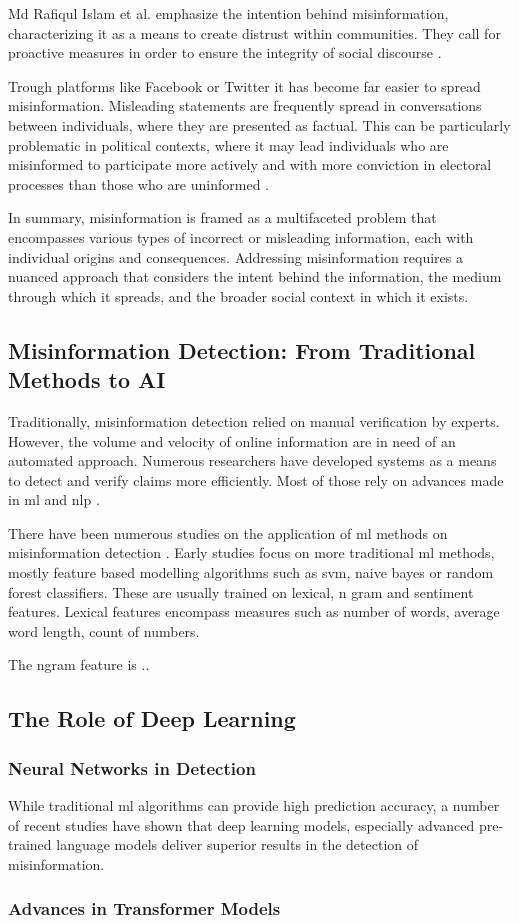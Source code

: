 Md Rafiqul Islam et al. emphasize the intention behind misinformation, characterizing it as a means to create distrust within communities. They call for proactive measures in order to ensure the integrity of social discourse \cite{mi_rafiqul}. 

Trough platforms like Facebook or Twitter it has become far easier to spread misinformation. Misleading statements are frequently spread in conversations between individuals, where they are presented as factual. This can be particularly problematic in political contexts, where it may lead individuals who are misinformed to participate more actively and with more conviction in electoral processes than those who are uninformed \cite{mi_fernandez}.

In summary, misinformation is framed as a multifaceted problem that encompasses various types of incorrect or misleading information, each with individual origins and consequences. Addressing misinformation requires a nuanced approach that considers the intent behind the information, the medium through which it spreads, and the broader social context in which it exists.

\subsection{Misinformation Detection: From Traditional Methods to AI}
Traditionally, misinformation detection relied on manual verification by experts. However, the volume and velocity of online information are in need of an automated approach. Numerous researchers have developed systems as a means to detect and verify claims more efficiently. Most of those rely on advances made in \gls{ml} and \gls{nlp} \cite{claimbuster_arslan}.

There have been numerous studies on the application of \gls{ml} methods on misinformation detection \cite{MD_ML_1}\cite{MD_ML_2}\cite{MD_ML_3}\cite{MD_ML_4}. Early studies focus on more traditional \gls{ml} methods, mostly feature based modelling algorithms such as \gls{svm}, naive bayes or random forest classifiers. These are usually trained on lexical, n gram and sentiment features. Lexical features encompass measures such as number of words, average word length, count of numbers. 

The ngram feature is .. %


\subsection{The Role of Deep Learning}

\subsubsection{Neural Networks in Detection}
While traditional \gls{ml} algorithms can provide high prediction accuracy, a number of recent studies have shown that deep learning models, especially advanced pre-trained language models deliver superior results in the detection of misinformation. 

\subsubsection{Advances in Transformer Models}
